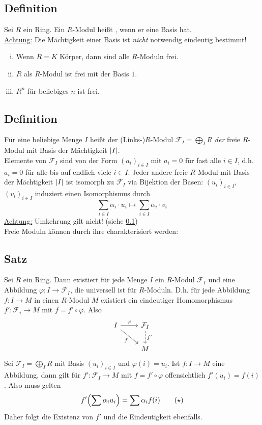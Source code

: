 \subsection[Definition: Freier Modul]{Definition} %
\label{sub:233}
Sei $R$ ein Ring. Ein $R$-Modul heißt , wenn er eine Basis hat. \\
\uline{Achtung:} Die Mächtigkeit einer Basis ist \emph{nicht} notwendig eindeutig bestimmt!
\begin{enumerate}[(i)]
	\item Wenn $R=K$ Körper, dann sind alle $R$-Moduln frei.
	\item $R$ als $R$-Modul ist frei mit der Basis $1$.
	\item $R^n$ für beliebiges $n$ ist frei.
\end{enumerate}

\subsection[Definition: Freier $R$-Modul mit Basis der Mächtigkeit $\abs*{I}$]{Definition} %
\label{sub:234}
Für eine beliebige Menge $I$ heißt der (Links-)$R$-Modul $\mathcal{F}_I = \bigoplus_{I} R$ \emph{der} freie $R$-Modul mit Basis der Mächtigkeit $\abs*{I}$. 
\bigskip \\
Elemente von $\mathcal{F}_I$ sind von der Form $(a_i)_{i \in I}$ mit $a_i=0$ für fast alle $i \in I$, d.h. $a_i = 0$ für alle bis auf endlich viele $i \in I$. Jeder andere
freie $R$-Modul mit Basis der Mächtigkeit $\abs*{I}$ ist isomorph zu $\mathcal{F}_I$ via Bijektion der Basen: $(u_i)_{i \in I}$, $(v_i)_{i \in I}$ induziert einen 
Isomorphismus durch
\[
	\sum_{i \in I} \alpha_i \cdot u_i \mapsto \sum_{i \in I} \alpha_i \cdot v_i
\]
\uline{Achtung:} Umkehrung gilt nicht! (siehe \ref{sub:233}) \\
Freie Moduln können durch ihre  charakterisiert werden:

\subsection[Satz: Universelle Eigenschaft der freien $R$-Moduln]{Satz} %
\label{sub:235}
Sei $R$ ein Ring. Dann existiert für jede Menge $I$ ein $R$-Modul $\mathcal{F}_I $ und eine Abbildung $\varphi : I \to \mathcal{F}_I $, die universell ist für 
$R$-Moduln. D.h. für jede Abbildung $f : I \to M$ in einen $R$-Modul $M$ existiert ein eindeutiger Homomorphismus $f' : \mathcal{F}_i  \to M $ mit $f = f' \circ  \varphi$.
Also
\[
	\begin{tikzcd}
		I \rar{\varphi} \drar[swap]{f}& \mathcal{F}_I \dar[dashed]{f'} \\
		& M 
	\end{tikzcd}
\]
Sei $\mathcal{F}_I = \bigoplus_I R$ mit Basis $(u_i)_{i \in I}$ und $\varphi(i)=u_i$. Ist $f : I \to M$ eine Abbildung, dann gilt für $f' : \mathcal{F}_I \to M$ mit 
$f=  f' \circ \varphi$ offensichtlich $f'(u_i)= f(i)$. Also muss gelten 
\[
	f'\enbrace*{\sum \alpha_i u_i} = \sum \alpha_i f(i) \tag*{($\star$)}
\]
Daher folgt die Existenz von $f'$ und die Eindeutigkeit ebenfalls. \bewende

